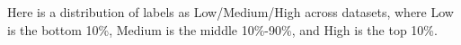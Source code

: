 \documentclass[preview]{standalone}
\begin{document}
Here is a distribution of labels as Low/Medium/High across datasets, where Low is the bottom 10\%, Medium is the middle 10\%-90\%, and High is the top 10\%.\\
\end{document}
